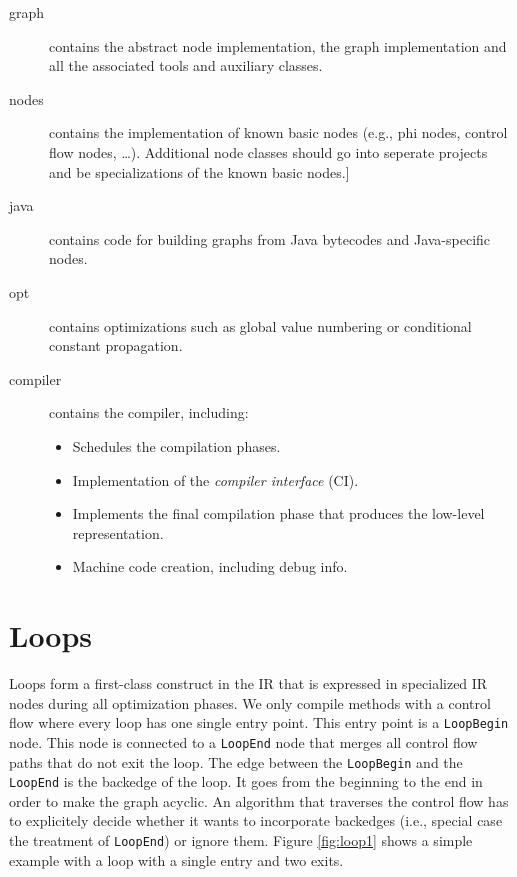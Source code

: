 \documentclass[twocolumn]{svjour3}
\newcommand\nodename[1]{\texttt{#1}}
\begin{document}
\begin{description}
    \item[graph] contains the abstract node implementation, the graph implementation and all the associated tools and auxiliary classes.
    \item[nodes] contains the implementation of known basic nodes (e.g., phi nodes, control flow nodes, \ldots).
 				 Additional node classes should go into seperate projects and be specializations of the known basic nodes.]
    \item[java] contains code for building graphs from Java bytecodes and Java-specific nodes.
    \item[opt] contains optimizations such as global value numbering or conditional constant propagation.
    \item[compiler] contains the compiler, including:
        \begin{itemize}
            \item Schedules the compilation phases.
            \item Implementation of the \emph{compiler interface} (CI).
            \item Implements the final compilation phase that produces the low-level representation.
            \item Machine code creation, including debug info.
        \end{itemize}
\end{description}

\section{Loops}
\label{sec:loops}
Loops form a first-class construct in the IR that is expressed in specialized IR nodes during all optimization phases.
We only compile methods with a control flow where every loop has one single entry point.
This entry point is a \nodename{LoopBegin} node.
This node is connected to a \nodename{LoopEnd} node that merges all control flow paths that do not exit the loop.
The edge between the \nodename{LoopBegin} and the \nodename{LoopEnd} is the backedge of the loop.
It goes from the beginning to the end in order to make the graph acyclic.
An algorithm that traverses the control flow has to explicitely decide whether it wants to incorporate backedges (i.e., special case the treatment of \nodename{LoopEnd}) or ignore them.
Figure \ref{fig:loop1} shows a simple example with a loop with a single entry and two exits.
\end{document}
